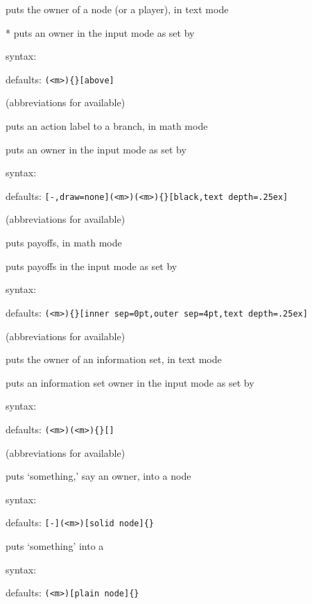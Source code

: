 \begin{description}\tightlist
\item \icmd{\xtOwner} puts the owner of a node (or a player), in text mode
\item \icmd{\xtOwner}* puts an owner in the input mode as set by \cmd{\setistmathTF(*)}\par
  syntax: \par
  defaults: \verb+(<m>){}[above]+\par
  (abbreviations for  available)
  
\item \icmd{\xtActionLabel} puts an action label to a branch, in math mode
\item \icmd{\xtActionLabel*} puts an owner in the input mode as set by \cmd{\setistmathTF(*)}\par
  syntax: \par
  defaults: \verb+[-,draw=none](<m>)(<m>){}[black,text depth=.25ex]+\par
  (abbreviations for  available)

\item \icmd{\xtPayoff} puts payoffs, in math mode
\item \icmd{\xtPayoff*} puts payoffs in the input mode as set by \cmd{\setistmathTF(*)}\par
  syntax: \par
  defaults: \verb+(<m>){}[inner sep=0pt,outer sep=4pt,text depth=.25ex]+\par
  (abbreviations for  available)

\item \icmd{\xtInfosetOwner} puts the owner of an information set, in text mode
\item \icmd{\xtInfosetOwner*} puts an information set owner in the input mode as set by \cmd{\setistmathTF(*)}\par
  syntax: \par
  defaults: \verb+(<m>)(<m>){}[]+\par
  (abbreviations for  available)

\item \icmd{\xtNode} puts `something,' say an owner, into a node\par
  syntax: \par
  defaults: \verb+[-](<m>)[solid node]{}+

\item \icmd{\xtNode*} puts `something' into a \par
  syntax: \par
  defaults: \verb+(<m>)[plain node]{}+
\end{description}

